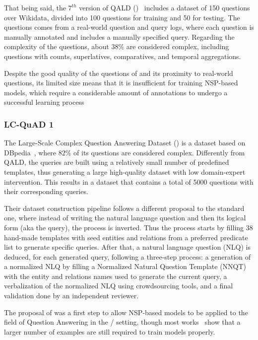 That being said, the $7^{th}$ version of QALD (\QALDseven)~\cite{dataset:qald7-UsbeckNHKRN17} includes a 
dataset of 150 questions over Wikidata, divided into 100 questions for training and 50 for 
testing. The questions comes from a real-world question and query logs, where each question is 
manually annotated and includes a manually specified \SPARQL{} query. Regarding the complexity of 
the questions, about 38\% are considered complex, including questions with counts, superlatives, 
comparatives, and temporal aggregations.

Despite the good quality of the questions of \QALDseven{} and its proximity to real-world questions, 
its limited size means that it is insufficient for training NSP-based models, which require a 
considerable amount of annotations to undergo a successful learning process

\subsubsection{LC-QuAD 1}
\label{cap2:theoFrame/qakg/benchmarkDatasets/lcquad}
The Large-Scale Complex Question Answering Dataset (\LCQuADone{}) is a dataset based on 
DBpedia~\cite{dataset:lcquad-TrivediMDL17}, where 82\% of its questions are considered complex. 
Differently from QALD, the \SPARQL{} queries are built using a relatively small number of 
predefined templates, thus generating a large high-quality dataset with low domain-expert 
intervention. This results in a dataset that contains a total of 5000 questions with their 
corresponding queries.

Their dataset construction pipeline follows a different proposal to the standard one, where 
instead of writing the natural language question and then its logical form (aka the \SPARQL{} 
query), the process is inverted. Thus the process starts by filling 38 hand-made \SPARQL{} 
templates with seed entities and relations from a preferred predicate list to generate specific 
\SPARQL{} queries. After that, a natural language question (NLQ) is deduced, for each generated 
\SPARQL{} query, following a three-step process: a generation of a normalized NLQ by filling a 
Normalized Natural Question Template (NNQT) with the entity and relations names used to 
generate the current query, a verbalization of the normalized NLQ using crowdsourcing tools, 
and a final validation done by an independent reviewer.

The proposal of \LCQuADone{} was a first step to allow NSP-based models to be applied to the field 
of Question Answering in the \RDF{}/\SPARQL{} setting, though most works~\cite{qa:FuQTLYS20abs-2007-13069} 
show that a larger number of examples are still required to train models properly.

